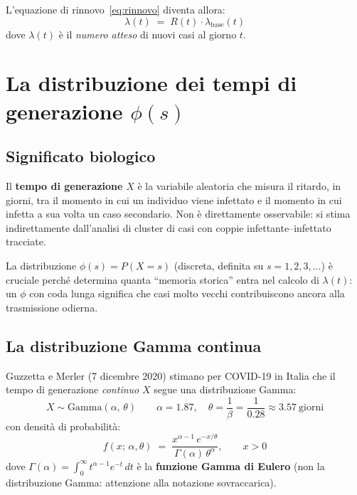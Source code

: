 \documentclass[12pt,a4paper]{article}
\newcommand{\lbase}{\lambda_{\mathrm{base}}}
\begin{document}
L'equazione di rinnovo~\eqref{eq:rinnovo} diventa allora:
\begin{equation}
  \boxed{\lambda(t) \;=\; R(t) \cdot \lbase(t)}
  \label{eq:lambda}
\end{equation}
dove $\lambda(t)$ è il \emph{numero atteso} di nuovi casi al giorno $t$.

\section{La distribuzione dei tempi di generazione $\phi(s)$}
\label{sec:phi}

\subsection{Significato biologico}

Il \textbf{tempo di generazione} $X$ è la variabile aleatoria che misura il ritardo,
in giorni, tra il momento in cui un individuo viene infettato e il momento in cui
infetta a sua volta un caso secondario. Non è direttamente osservabile: si stima
indirettamente dall'analisi di cluster di casi con coppie infettante--infettato tracciate.

La distribuzione $\phi(s) = P(X = s)$ (discreta, definita su $s = 1, 2, 3, \ldots$)
è cruciale perché determina quanta ``memoria storica'' entra nel calcolo di $\lambda(t)$:
un $\phi$ con coda lunga significa che casi molto vecchi contribuiscono ancora
alla trasmissione odierna.

\subsection{La distribuzione Gamma continua}

Guzzetta e Merler (7 dicembre 2020) stimano per COVID-19 in Italia che il tempo di
generazione \emph{continuo} $X$ segue una distribuzione Gamma:
\begin{equation}
  X \sim \mathrm{Gamma}(\alpha,\, \theta) \qquad \alpha = 1.87, \quad \theta = \frac{1}{\beta} = \frac{1}{0.28} \approx 3.57\ \text{giorni}
\end{equation}
con densità di probabilità:
\begin{equation}
  f(x;\,\alpha,\theta) \;=\; \frac{x^{\alpha-1}\, e^{-x/\theta}}{\Gamma(\alpha)\, \theta^{\alpha}}, \qquad x > 0
  \label{eq:gamma_pdf}
\end{equation}
dove $\Gamma(\alpha) = \int_0^\infty t^{\alpha-1} e^{-t}\, dt$ è la \textbf{funzione Gamma
di Eulero} (non la distribuzione Gamma: attenzione alla notazione sovraccarica).
\end{document}
